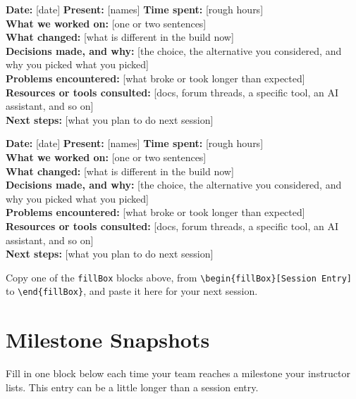 \documentclass[11pt]{article}
\begin{document}
\begin{fillBox}
\textbf{Date:} [date] \quad \textbf{Present:} [names] \quad \textbf{Time spent:} [rough hours] \\
\textbf{What we worked on:} [one or two sentences] \\
\textbf{What changed:} [what is different in the build now] \\
\textbf{Decisions made, and why:} [the choice, the alternative you considered, and why you picked what you picked] \\
\textbf{Problems encountered:} [what broke or took longer than expected] \\
\textbf{Resources or tools consulted:} [docs, forum threads, a specific tool, an AI assistant, and so on] \\
\textbf{Next steps:} [what you plan to do next session]
\end{fillBox}

\begin{fillBox}
\textbf{Date:} [date] \quad \textbf{Present:} [names] \quad \textbf{Time spent:} [rough hours] \\
\textbf{What we worked on:} [one or two sentences] \\
\textbf{What changed:} [what is different in the build now] \\
\textbf{Decisions made, and why:} [the choice, the alternative you considered, and why you picked what you picked] \\
\textbf{Problems encountered:} [what broke or took longer than expected] \\
\textbf{Resources or tools consulted:} [docs, forum threads, a specific tool, an AI assistant, and so on] \\
\textbf{Next steps:} [what you plan to do next session]
\end{fillBox}

\begin{tipBox}
Copy one of the \texttt{fillBox} blocks above, from \texttt{\textbackslash begin\{fillBox\}[Session Entry]} to \texttt{\textbackslash end\{fillBox\}}, and paste it here for your next session.
\end{tipBox}

\section{Milestone Snapshots}

Fill in one block below each time your team reaches a milestone your instructor lists. This entry can be a little longer than a session entry.
\end{document}
